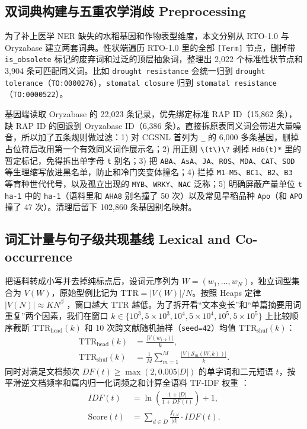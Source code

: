 \documentclass[conference]{IEEEtran}
\begin{document}
\subsection{双词典构建与五重农学消歧 Preprocessing}
为了补上医学 NER 缺失的水稻基因和作物表型维度，本文分别从 RTO-1.0 与 Oryzabase 建立两套词典。性状端遍历 RTO-1.0 里的全部 \texttt{[Term]} 节点，删掉带 \texttt{is\_obsolete} 标记的废弃词和过泛的顶层抽象词，整理出 2,022 个标准性状节点和 3,904 条可匹配同义词。比如 \texttt{drought resistance} 会统一归到 \texttt{drought tolerance}（\texttt{TO:0000276}），\texttt{stomatal closure} 归到 \texttt{stomatal resistance}（\texttt{TO:0000522}）。

基因端读取 Oryzabase 的 22,023 条记录，优先绑定标准 RAP ID（15,862 条），缺 RAP ID 的回退到 Oryzabase ID（6,386 条）。直接拆原表同义词会带进大量噪音，所以加了五条规则做过滤：1) 对 CGSNL 首列为 \texttt{\_} 的 6,000 多条基因，删掉占位符后改用第一个有效同义词作展示名；2) 用正则 \texttt{\textbackslash(t\textbackslash)\textbackslash*?} 剥掉 \texttt{Hd6(t)*} 里的暂定标记，免得拆出单字母 \texttt{t} 别名；3) 把 \texttt{ABA}、\texttt{AsA}、\texttt{JA}、\texttt{ROS}、\texttt{MDA}、\texttt{CAT}、\texttt{SOD} 等生理缩写放进黑名单，防止和冷门突变体撞名；4) 拦掉 \texttt{M1}--\texttt{M5}、\texttt{BC1}、\texttt{B2}、\texttt{B3} 等育种世代代号，以及孤立出现的 \texttt{MYB}、\texttt{WRKY}、\texttt{NAC} 泛称；5) 明确屏蔽产量单位 \texttt{t ha-1} 中的 \texttt{ha-1}（语料里和 \texttt{AHA8} 别名撞了 50 次）以及常见旱稻品种 \texttt{Apo}（和 \texttt{APO} 撞了 47 次）。清理后留下 102,860 条基因别名映射。

\subsection{词汇计量与句子级共现基线 Lexical and Co-occurrence}
把语料转成小写并去掉纯标点后，设词元序列为 $W=(w_1,\dots,w_N)$，独立词型集合为 $V(W)$，原始型例比记为 $\text{TTR} = |V(W)|/N$。按照 Heaps 定律 $|V(N)| \approx K N^{\beta}$ \cite{heaps1978}，窗口越大 TTR 越低。为了拆开看“文本变长”和“单篇摘要用词重复”两个因素，我们在窗口 $k \in \{10^3, 5\times 10^3, 10^4, 5\times 10^4, 10^5, 5\times 10^5\}$ 上比较顺序截断 $\text{TTR}_{\text{head}}(k)$ 和 10 次跨文献随机抽样（\texttt{seed=42}）均值 $\text{TTR}_{\text{shuf}}(k)$：
\begin{equation}
\begin{aligned}
\text{TTR}_{\text{head}}(k) &= \frac{|V(w_{1:k})|}{k}, \\
\text{TTR}_{\text{shuf}}(k) &= \frac{1}{M}\sum_{m=1}^{M}\frac{|V(\mathcal{S}_m(W,k))|}{k}.
\end{aligned}
\label{eq:ttr}
\end{equation}
同时对满足文档频次 $DF(t) \ge \max(2, 0.005|D|)$ 的单字词和二元短语 $t$，按平滑逆文档频率和篇内归一化词频之和计算全语料 TF-IDF 权重 \cite{manning2008ir}：
\begin{equation}
\begin{aligned}
IDF(t) &= \ln\!\left(\frac{1+|D|}{1+DF(t)}\right)+1, \\
\text{Score}(t) &= \sum_{d\in D}\frac{f_{t,d}}{|d|}\cdot IDF(t).
\end{aligned}
\label{eq:tfidf}
\end{equation}
\end{document}
